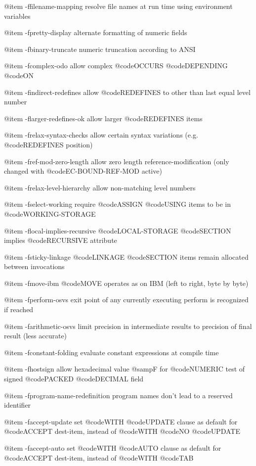 @item -ffilename-mapping
resolve file names at run time using environment variables

@item -fpretty-display
alternate formatting of numeric fields

@item -fbinary-truncate
numeric truncation according to ANSI

@item -fcomplex-odo
allow complex @code{OCCURS} @code{DEPENDING} @code{ON}

@item -findirect-redefines
allow @code{REDEFINES} to other than last equal level number

@item -flarger-redefines-ok
allow larger @code{REDEFINES} items

@item -frelax-syntax-checks
allow certain syntax variations (e.g. @code{REDEFINES} position)

@item -fref-mod-zero-length
allow zero length reference-modification (only changed with @code{EC-BOUND-REF-MOD} active)

@item -frelax-level-hierarchy
allow non-matching level numbers

@item -fselect-working
require @code{ASSIGN} @code{USING} items to be in @code{WORKING-STORAGE}

@item -flocal-implies-recursive
@code{LOCAL-STORAGE} @code{SECTION} implies @code{RECURSIVE} attribute

@item -fsticky-linkage
@code{LINKAGE} @code{SECTION} items remain allocated between invocations

@item -fmove-ibm
@code{MOVE} operates as on IBM (left to right, byte by byte)

@item -fperform-osvs
exit point of any currently executing perform is recognized if reached

@item -farithmetic-osvs
limit precision in intermediate results to precision of final result (less accurate)

@item -fconstant-folding
evaluate constant expressions at compile time

@item -fhostsign
allow hexadecimal value @samp{F} for @code{NUMERIC} test of signed @code{PACKED} @code{DECIMAL} field

@item -fprogram-name-redefinition
program names don't lead to a reserved identifier

@item -faccept-update
set @code{WITH} @code{UPDATE} clause as default for @code{ACCEPT} dest-item, instead of @code{WITH} @code{NO} @code{UPDATE}

@item -faccept-auto
set @code{WITH} @code{AUTO} clause as default for @code{ACCEPT} dest-item, instead of @code{WITH} @code{TAB}

